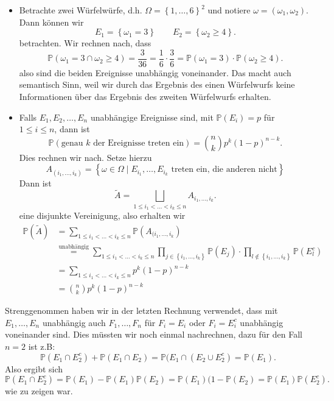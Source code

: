 \begin{example}
    \begin{itemize}
        \item 
    Betrachte zwei Würfelwürfe, d.h. $\Omega = \left \{1,\ldots,6\right\} ^2$ und notiere $\omega = (\omega_1,\omega_2)$. Dann können wir
    \[
    E_1 = \left \{\omega_1 = 3\right\}  \qquad E_2 = \left \{\omega_2 \geq  4\right\} 
    .\] 
    betrachten. Wir rechnen nach, dass
    \[
        \mathbb{P}(\omega_1 = 3 \cap \omega_2 \geq  4 ) = \frac{3}{36} = \frac{1}{6}\cdot \frac{3}{6} = \mathbb{P}(\omega_1 = 3) \cdot \mathbb{P}(\omega_2 \geq  4)
    .\] 
    also sind die beiden Ereignisse unabhängig voneinander. Das macht auch semantisch Sinn, weil wir durch das Ergebnis des einen Würfelwurfs keine Informationen über das Ergebnis des zweiten Würfelwurfs erhalten.
\item

Falls $E_1,E_2,\ldots,E_n$ unabhängige Ereignisse sind, mit $\mathbb{P}(E_i) = p$ für $1\leq i\leq n$, dann ist
\[
    \mathbb{P}(\text{genau $k$ der Ereignisse treten ein}) = \binom{n}{k} p^k (1-p)^{n-k}
.\] 
Dies rechnen wir nach. Setze hierzu 
\[
    A_{(i_1,\ldots,i_k)} = \left \{\omega\in \Omega \mid  E_{i_1},\ldots,E_{i_k} \text{ treten ein, die anderen nicht}\right\}
\]
Dann ist
\[
\tilde{A} = \bigsqcup_{1\leq i_1<\ldots<i_k \leq n} A_{i_1,\ldots,i_k}
.\] 
eine disjunkte Vereinigung, also erhalten wir
\begin{equation}
    \begin{split}
        \mathbb{P}(\tilde{A})                                 &= \sum_{1\leq i_1<\ldots<i_k\leq n} \mathbb{P}(A_{(i_1,\ldots,i_k}) \\
                                                              &\stackrel{\text{unabhängig}}{=} \sum_{1\leq i_1<\ldots<i_k \leq n} \prod_{j\in \left \{i_1,\ldots,i_k\right\} } \mathbb{P}(E_j) \cdot \prod_{l \not\in \left \{i_1,\ldots,i_k\right\} } \mathbb{P}(E_l^{c}) \\
                                                              &= \sum_{1\leq i_1<\ldots<i_k \leq n} p^k(1-p)^{n-k} \\
                                                              &= \binom{n}{k} p^k (1-p)^{n-k}
    \end{split}
\end{equation}
    \end{itemize}
\end{example}
\begin{remark}
    Strenggenommen haben wir in der letzten Rechnung verwendet, dass mit $E_1,\ldots,E_n$ unabhängig auch $F_1,\ldots,F_n$ für $F_i = E_i $ oder  $F_i = E_i ^{c}$ unabhängig voneinander sind. Dies müssten wir noch einmal nachrechnen, dazu für den Fall $n=2$ ist z.B:
     \[
         \mathbb{P}(E_1 \cap E_2^{c}) + \mathbb{P}(E_1 \cap E_2) = \mathbb{P}(E_1 \cap (E_2 \cup E_2^{c}) = \mathbb{P}(E_1)
    .\] 
    Also ergibt sich
    \[
        \mathbb{P}(E_1\cap E_2^{c}) = \mathbb{P}(E_1) - \mathbb{P}(E_1)\mathbb{P}(E_2) = \mathbb{P}(E_1)(1-\mathbb{P}(E_2) = \mathbb{P}(E_1) \mathbb{P}(E_2^{c})
    .\] 
    wie zu zeigen war.
\end{remark}
